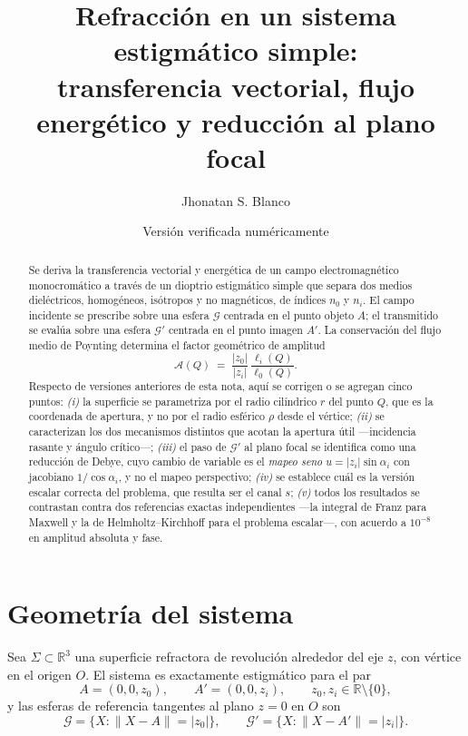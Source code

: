 \documentclass[11pt,a4paper]{article}
\title{Refracción en un sistema estigmático simple:\\
transferencia vectorial, flujo energético y reducción al plano focal}
\author{Jhonatan S. Blanco}
\date{Versión verificada numéricamente}
\begin{document}
\maketitle

\begin{abstract}
Se deriva la transferencia vectorial y energética de un campo electromagnético
monocromático a través de un dioptrio estigmático simple que separa dos medios
dieléctricos, homogéneos, isótropos y no magnéticos, de índices $n_0$ y $n_i$.
El campo incidente se prescribe sobre una esfera $\mathcal{G}$ centrada en el
punto objeto $A$; el transmitido se evalúa sobre una esfera $\mathcal{G}'$
centrada en el punto imagen $A'$. La conservación del flujo medio de Poynting
determina el factor geométrico de amplitud
\begin{equation}
  \mathcal{A}(Q) \;=\; \frac{|z_0|}{|z_i|}\,\frac{\ell_i(Q)}{\ell_0(Q)} .
  \label{eq:A}
\end{equation}
Respecto de versiones anteriores de esta nota, aquí se corrigen o se agregan
cinco puntos: \emph{(i)} la superficie se parametriza por el radio cilíndrico
$r$ del punto $Q$, que es la coordenada de apertura, y no por el radio
esférico $\rho$ desde el vértice; \emph{(ii)} se caracterizan los dos
mecanismos distintos que acotan la apertura útil ---incidencia rasante y
ángulo crítico---; \emph{(iii)} el paso de $\mathcal{G}'$ al plano focal se
identifica como una reducción de Debye, cuyo cambio de variable es el
\emph{mapeo seno} $u=|z_i|\sin\alpha_i$ con jacobiano $1/\cos\alpha_i$, y no
el mapeo perspectivo; \emph{(iv)} se establece cuál es la versión escalar
correcta del problema, que resulta ser el canal $s$; \emph{(v)} todos los
resultados se contrastan contra dos referencias exactas independientes ---la
integral de Franz para Maxwell y la de Helmholtz--Kirchhoff para el problema
escalar---, con acuerdo a $10^{-8}$ en amplitud absoluta y fase.
\end{abstract}

\section{Geometría del sistema}

Sea $\Sigma\subset\mathbb{R}^3$ una superficie refractora de revolución
alrededor del eje $z$, con vértice en el origen $O$. El sistema es
exactamente estigmático para el par
\begin{equation}
  A=(0,0,z_0),\qquad A'=(0,0,z_i),\qquad z_0,z_i\in\mathbb{R}\setminus\{0\},
\end{equation}
y las esferas de referencia tangentes al plano $z=0$ en $O$ son
\begin{equation}
  \mathcal{G}=\{X: \|X-A\|=|z_0|\},\qquad
  \mathcal{G}'=\{X: \|X-A'\|=|z_i|\}.
\end{equation}
\end{document}
